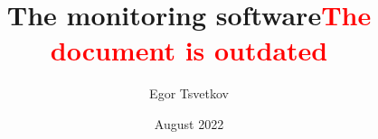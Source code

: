 \documentclass[a4paper,12pt]{book}
\begin{document}
\author{Egor Tsvetkov}
\title{The monitoring software\textcolor{red}{The document is outdated}}
\date{August 2022}

\frontmatter
\maketitle
\tableofcontents

\mainmatter



\backmatter
\end{document}
